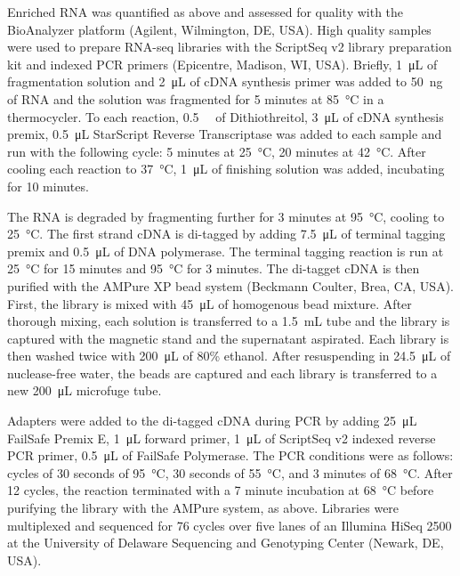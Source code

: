 Enriched RNA was quantified as above and assessed for quality with the BioAnalyzer platform (Agilent, Wilmington, DE, USA). High quality samples were used to prepare RNA-seq libraries with the ScriptSeq v2 library preparation kit and indexed PCR primers (Epicentre, Madison, WI, USA). Briefly, \SI{1}{\micro\liter} of fragmentation solution and \SI{2}{\micro\liter} of cDNA synthesis primer was added to \SI{50}{\nano\gram} of RNA and the solution was fragmented for 5 minutes at \SI{85}{\degreeCelsius} in a thermocycler. To each reaction, \SI{0.5}{\milli\Molar} of Dithiothreitol, \SI{3}{\micro\liter} of cDNA synthesis premix, \SI{0.5}{\micro\liter} StarScript Reverse Transcriptase was added to each sample and run with the following cycle: 5 minutes at \SI{25}{\degreeCelsius}, 20 minutes at \SI{42}{\degreeCelsius}. After cooling each reaction to \SI{37}{\degreeCelsius}, \SI{1}{\micro\liter} of finishing solution was added, incubating for 10 minutes. 

The RNA is degraded by fragmenting further for 3 minutes at \SI{95}{\degreeCelsius}, cooling to \SI{25}{\degreeCelsius}. The first strand cDNA is di-tagged by adding \SI{7.5}{\micro\liter} of terminal tagging premix and \SI{0.5}{\micro\liter} of DNA polymerase. The terminal tagging reaction is run at \SI{25}{\degreeCelsius} for 15 minutes and \SI{95}{\degreeCelsius} for 3 minutes. The di-tagget cDNA is then purified with the AMPure XP bead system (Beckmann Coulter, Brea, CA, USA). First, the library is mixed with \SI{45}{\micro\liter} of homogenous bead mixture. After thorough mixing, each solution is transferred to a \SI{1.5}{\milli\liter} tube and the library is captured with the magnetic stand and the supernatant aspirated. Each library is then washed twice with \SI{200}{\micro\liter} of 80\% ethanol. After resuspending in \SI{24.5}{\micro\liter} of nuclease-free water, the beads are captured and each library is transferred to a new \SI{200}{\micro\liter} microfuge tube. 

Adapters were added to the di-tagged cDNA during PCR by adding \SI{25}{\micro\liter} FailSafe Premix E, \SI{1}{\micro\liter} forward primer, \SI{1}{\micro\liter} of ScriptSeq v2 indexed reverse PCR primer, \SI{0.5}{\micro\liter} of FailSafe Polymerase. The PCR conditions were as follows: cycles of 30 seconds of \SI{95}{\degreeCelsius}, 30 seconds of \SI{55}{\degreeCelsius}, and 3 minutes of \SI{68}{\degreeCelsius}. After 12 cycles, the reaction terminated with a 7 minute incubation at \SI{68}{\degreeCelsius} before purifying the library with the AMPure system, as above.  Libraries were multiplexed and sequenced for 76 cycles over five lanes of an Illumina HiSeq 2500 at the University of Delaware Sequencing and Genotyping Center (Newark, DE, USA).
